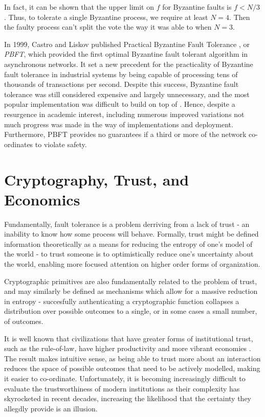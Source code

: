 In fact, it can be shown that the upper limit on $f$ for Byzantine faults is $f < N/3$ \cite{pease1980reaching}.
Thus, to tolerate a single Byzantine process, we require at least $N=4$. 
Then the faulty process can't split the vote the way it was able to when $N=3$.

In 1999, Castro and Liskov published Practical Byzantine Fault Tolerance \cite{pbft}, or \emph{PBFT}, 
which provided the first optimal Byzantine fault tolerant algorithm in asynchronous networks.
It set a new precedent for the practicality of Byzantine fault tolerance in industrial systems by being capable 
of processing tens of thousands of transactions per second.
Despite this success, Byzantine fault tolerance was still considered expensive and largely unnecessary, 
and the most popular implementation was difficult to build on top of \cite{ppbft}.
Hence, despite a resurgence in academic interest, including numerous improved variations \cite{yin2003separating, kotla2007zyzzyva}
not much progress was made in the way of implementations and deployment.
Furthermore, PBFT provides no guarantees if a third or more of the network co-ordinates to violate safety.

\section{Cryptography, Trust, and Economics}

Fundamentally, fault tolerance is a problem derriving from a lack of trust - 
an inability to know how some process will behave.
Formally, trust might be defined information theoretically as a means
for reducing the entropy of one's model of the world - 
to trust someone is to optimistically reduce one's uncertainty about the world,
enabling more focused attention on higher order forms of organization.

Cryptographic primitives are also fundamentally related to the problem of trust,
and may similarly be defined as mechanisms which allow for a massive reduction in entropy -
succesfully authenticating a cryptographic function collapses a distribution 
over possible outcomes to a single, or in some cases a small number, of outcomes.

It is well known that civilizations that have greater forms of institutional trust,
such as the rule-of-law, 
have higher productivity and more vibrant economies \cite{zak2001trust}.
The result makes intuitive sense, as being able to trust more about an interaction 
reduces the space of possible outcomes that need to be actively modelled,
making it easier to co-ordinate.
Unfortunately, it is becoming increasingly difficult to evaluate the trustworthiness 
of modern institutions as their complexity has skyrocketed in recent decades,
increasing the likelihood that the certainty they allegdly provide is an illusion.

